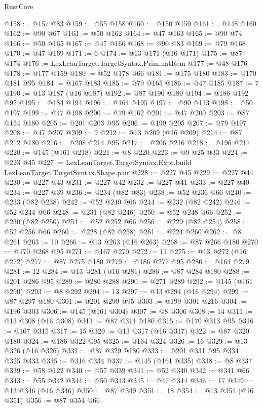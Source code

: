 \begin{lexlean}{RustCore}
\begin{coremodule}
@158 := @157 @83
@159 := @55 @158
@160 := @150 @159
@161 := @148 @160
@162 := @90 @67
@163 := @50 @162
@164 := @47 @163
@165 := @90 @74
@166 := @50 @165
@167 := @47 @166
@168 := @90 @83
@169 := @79 @168
@170 := @47 @169
@171 := 6
@174 := @13 @171 (@16 @171)
@175 := @87 @174
@176 := LexLeanTarget.TargetSyntax.Prim.natRem
@177 := @48 @176
@178 := @177 @159
@180 := @52 @178 @66
@181 := @175 @180
@183 := @170 @181 @95
@184 := @167 @183
@185 := @79 @165
@186 := @47 @185
@187 := 7
@190 := @13 @187 (@16 @187)
@192 := @87 @190 @180
@194 := @186 @192 @95
@195 := @184 @194
@196 := @164 @195
@197 := @90 @113
@198 := @50 @197
@199 := @47 @198
@200 := @79 @162
@201 := @47 @200
@203 := @87 @154 @180
@205 := @201 @203 @95
@206 := @199 @205
@207 := @79 @197
@208 := @47 @207
@209 := 9
@212 := @13 @209 (@16 @209)
@214 := @87 @212 @180
@216 := @208 @214 @95
@217 := @206 @216
@218 := @196 @217
@220 := @145 (@161 @218)
@221 := @8 @220
@223 := @9 @25 @33
@224 := @223 @45
@227 := LexLeanTarget.TargetSyntax.Expr.build LexLeanTarget.TargetSyntax.Shape.pair
@228 := @227 @45
@229 := @227 @44
@230 := @227 @43
@231 := @227 @42
@232 := @227 @41
@233 := @227 @40
@234 := @227 @39
@236 := @234 (@82 @83)
@238 := @52 @236 @66
@240 := @233 (@82 @238)
@242 := @52 @240 @66
@244 := @232 (@82 @242)
@246 := @52 @244 @66
@248 := @231 (@82 @246)
@250 := @52 @248 @66
@252 := @230 (@82 @250)
@254 := @52 @252 @66
@256 := @229 (@82 @254)
@258 := @52 @256 @66
@260 := @228 (@82 @258)
@261 := @224 @260
@262 := @8 @261
@263 := 10
@266 := @13 @263 (@16 @263)
@268 := @87 @266 @180
@270 := @170 @268 @95
@271 := @167 @270
@272 := 11
@275 := @13 @272 (@16 @272)
@277 := @87 @275 @180
@279 := @186 @277 @95
@280 := @164 @279
@281 := 12
@284 := @13 @281 (@16 @281)
@286 := @87 @284 @180
@288 := @201 @286 @95
@289 := @280 @288
@290 := @271 @289
@292 := @145 (@161 @290)
@293 := @8 @292
@294 := 13
@297 := @13 @294 (@16 @294)
@299 := @87 @297 @180
@301 := @201 @299 @95
@303 := @199 @301 @216
@304 := @196 @303
@306 := @145 (@161 @304)
@307 := @8 @306
@308 := 14
@311 := @13 @308 (@16 @308)
@313 := @87 @311 @180
@315 := @170 @313 @95
@316 := @167 @315
@317 := 15
@320 := @13 @317 (@16 @317)
@322 := @87 @320 @180
@324 := @186 @322 @95
@325 := @164 @324
@326 := 16
@329 := @13 @326 (@16 @326)
@331 := @87 @329 @180
@333 := @201 @331 @95
@334 := @325 @333
@335 := @316 @334
@337 := @145 (@161 @335)
@338 := @8 @337
@339 := @58 @122
@340 := @57 @339
@341 := @52 @340
@342 := @341 @66
@343 := @55 @342
@344 := @50 @343
@345 := @47 @344
@346 := 17
@349 := @13 @346 (@16 @346)
@350 := @87 @349
@351 := 18
@354 := @13 @351 (@16 @351)
@356 := @87 @354 @66

\end{coremodule}
\end{lexlean}
